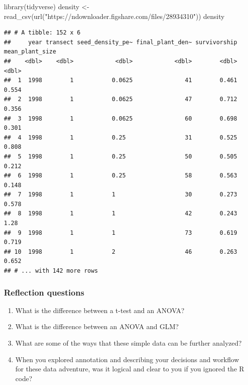 \documentclass[
]{book}
\newenvironment{Shaded}{\begin{snugshade}}{\end{snugshade}}
\newcommand{\FunctionTok}[1]{\textcolor[rgb]{0.00,0.00,0.00}{#1}}
\newcommand{\NormalTok}[1]{#1}
\newcommand{\OtherTok}[1]{\textcolor[rgb]{0.56,0.35,0.01}{#1}}
\newcommand{\StringTok}[1]{\textcolor[rgb]{0.31,0.60,0.02}{#1}}
\providecommand{\tightlist}{%
  \setlength{\itemsep}{0pt}\setlength{\parskip}{0pt}}
\begin{document}
\begin{Shaded}
\begin{Highlighting}[]
\FunctionTok{library}\NormalTok{(tidyverse)}
\NormalTok{density }\OtherTok{\textless{}{-}} \FunctionTok{read\_csv}\NormalTok{(}\FunctionTok{url}\NormalTok{(}\StringTok{"https://ndownloader.figshare.com/files/28934310"}\NormalTok{))}
\NormalTok{density}
\end{Highlighting}
\end{Shaded}

\begin{verbatim}
## # A tibble: 152 x 6
##     year transect seed_density_pe~ final_plant_den~ survivorship mean_plant_size
##    <dbl>    <dbl>            <dbl>            <dbl>        <dbl>           <dbl>
##  1  1998        1           0.0625               41        0.461           0.554
##  2  1998        1           0.0625               47        0.712           0.356
##  3  1998        1           0.0625               60        0.698           0.301
##  4  1998        1           0.25                 31        0.525           0.808
##  5  1998        1           0.25                 50        0.505           0.212
##  6  1998        1           0.25                 58        0.563           0.148
##  7  1998        1           1                    30        0.273           0.578
##  8  1998        1           1                    42        0.243           1.28 
##  9  1998        1           1                    73        0.619           0.719
## 10  1998        1           2                    46        0.263           0.652
## # ... with 142 more rows
\end{verbatim}

\hypertarget{reflection-questions-1}{%
\subsubsection*{Reflection questions}\label{reflection-questions-1}}

\begin{enumerate}
\def\labelenumi{\arabic{enumi}.}
\tightlist
\item
  What is the difference between a t-test and an ANOVA?\\
\item
  What is the difference between an ANOVA and GLM?\\
\item
  What are some of the ways that these simple data can be further analyzed?\\
\item
  When you explored annotation and describing your decisions and workflow for these data adventure, was it logical and clear to you if you ignored the R code?
\end{enumerate}
\end{document}

